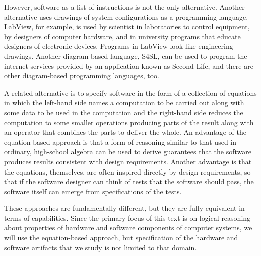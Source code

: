 However, software as a list of instructions is
not the only alternative.
Another alternative uses drawings of
system configurations as a programming language.
LabView, for example,
is used by scientist in laboratories to control equipment,
by designers of computer hardware,
and in university programs that educate designers of
electronic devices. Programs in LabView look like engineering drawings.
Another diagram-based language,
S4SL, can be used to program the internet services provided
by an application known as Second Life, and there
are other diagram-based programming languages, too.

A related alternative is to specify software in the form of
a collection of equations in which
the left-hand side names a computation to be carried out
along with some data to be used in the computation
and the right-hand side reduces the computation to
some smaller operations producing parts of the result
along with an operator that combines the parts to deliver the whole.
An advantage of the equation-based approach
is that a form of reasoning similar to that used
in ordinary, high-school algebra can be used to derive
guarantees that the software produces results consistent
with design requirements.
Another advantage is that the equations, themselves,
are often inspired directly by design requirements,
so that if the software designer can think of tests
that the software should pass, the software itself
can emerge from specifications of the tests.

These approaches are fundamentally different, but they
are fully equivalent in terms of capabilities.
Since the primary focus of this text is on logical reasoning
about properties of hardware and software components of computer systems,
we will use the equation-based approach,
but specification of the hardware and software artifacts that we study
is not limited to that domain.

